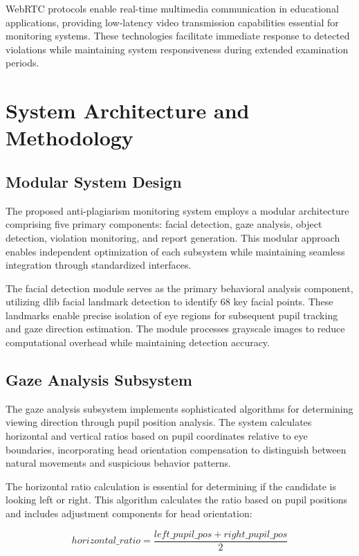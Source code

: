 \documentclass[conference]{IEEEtran}
\begin{document}
WebRTC protocols enable real-time multimedia communication in educational applications, providing low-latency video transmission capabilities essential for monitoring systems\cite{sredojev2015webrtc}. These technologies facilitate immediate response to detected violations while maintaining system responsiveness during extended examination periods.

\section{System Architecture and Methodology}

\subsection{Modular System Design}

The proposed anti-plagiarism monitoring system employs a modular architecture comprising five primary components: facial detection, gaze analysis, object detection, violation monitoring, and report generation. This modular approach enables independent optimization of each subsystem while maintaining seamless integration through standardized interfaces.

The facial detection module serves as the primary behavioral analysis component, utilizing dlib facial landmark detection to identify 68 key facial points. These landmarks enable precise isolation of eye regions for subsequent pupil tracking and gaze direction estimation. The module processes grayscale images to reduce computational overhead while maintaining detection accuracy.

\subsection{Gaze Analysis Subsystem}

The gaze analysis subsystem implements sophisticated algorithms for determining viewing direction through pupil position analysis. The system calculates horizontal and vertical ratios based on pupil coordinates relative to eye boundaries, incorporating head orientation compensation to distinguish between natural movements and suspicious behavior patterns.

The horizontal ratio calculation is essential for determining if the candidate is looking left or right. This algorithm calculates the ratio based on pupil positions and includes adjustment components for head orientation:

\begin{equation}
horizontal\_ratio = \frac{left\_pupil\_pos + right\_pupil\_pos}{2}
\end{equation}
\end{document}
